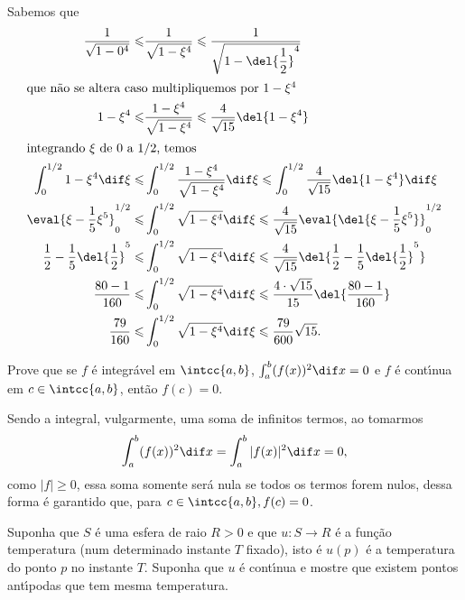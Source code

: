 \documentclass{IMTexam}
\begin{document}
\begin{questions}
		\begin{solution}
			Sabemos que
			\begin{align*}
				\dfrac{1}{\sqrt{1-0^{4}}}\leqslant&\dfrac{1}{\sqrt{1-\xi^{4}}}\leqslant \dfrac{1}{\sqrt{1-\del{\dfrac{1}{2}}^{4}}}\\
				\intertext{que não se altera caso multipliquemos por $ 1-\xi^{4} $}
				1-\xi^{4}\leqslant&\dfrac{1-\xi^{4}}{\sqrt{1-\xi^{4}}}\leqslant \dfrac{4}{\sqrt{15}}\del{1-\xi^{4}}\\
				\intertext{integrando $ \xi $ de $ 0 $ a $ 1/2 $, temos}
				\int_{0}^{1/2}1-\xi^{4}\dif \xi\leqslant&\int_{0}^{1/2}\dfrac{1-\xi^{4}}{\sqrt{1-\xi^{4}}}\dif \xi\leqslant\int_{0}^{1/2}\dfrac{4}{\sqrt{15}}\del{1-\xi^{4}}\dif \xi\\
				\eval{\xi-\dfrac{1}{5}\xi^{5}}_{0}^{1/2}\leqslant&\int_{0}^{1/2}\sqrt{1-\xi^{4}}\dif \xi\leqslant\dfrac{4}{\sqrt{15}}\eval{\del{\xi-\dfrac{1}{5}\xi^{5}}}_{0}^{1/2}\\
				\dfrac{1}{2}-\dfrac{1}{5}\del{\dfrac{1}{2}}^{5}\leqslant&\int_{0}^{1/2}\sqrt{1-\xi^{4}}\dif \xi\leqslant\dfrac{4}{\sqrt{15}}\del{\dfrac{1}{2}-\dfrac{1}{5}\del{\dfrac{1}{2}}^{5}}\\
				\dfrac{80-1}{160}\leqslant&\int_{0}^{1/2}\sqrt{1-\xi^{4}}\dif \xi\leqslant\dfrac{4\cdot\sqrt{15}}{15}\del{\dfrac{80-1}{160}}\\
				\dfrac{79}{160}\leqslant&\int_{0}^{1/2}\sqrt{1-\xi^{4}}\dif \xi\leqslant\dfrac{79}{600}\sqrt{15}.
			\end{align*}
		\hfill\qedsymbol
		\end{solution}
		
		\titledquestion{Grupo IX --- Q18}
		
		Prove que se $ f $ é integrável em $ \intcc{a, b} $, $ \int_{a}^{b}(f(x))^{2} \dif x = 0 $ e $ f $ é contı́nua em $ c \in \intcc{a,b} $, então $ f(c) = 0 $.
		
		\begin{solution}
			Sendo a integral, vulgarmente, uma soma de infinitos termos, ao tomarmos \[ \int_{a}^{b} (f(x))^{2}\dif x=\int_{a}^{b} |f(x)|^{2}\dif x=0, \]
			como $ |f|\geqslant 0 $, essa soma somente será nula se todos os termos forem nulos, dessa forma é garantido que, para $ c\in\intcc{a,b},f(c)=0 $.
		\end{solution}
		
		
		Suponha que $ S $ é uma esfera de raio $ R > 0 $ e	que $ u : S \to R $ é a função temperatura (num determinado instante $ T $ fixado), isto é $ u(p) $ é a temperatura do ponto $ p $ no instante $ T $. Suponha que $ u $ é contı́nua e mostre que existem pontos antı́podas que tem mesma temperatura.
		

\end{questions}
\end{document}
